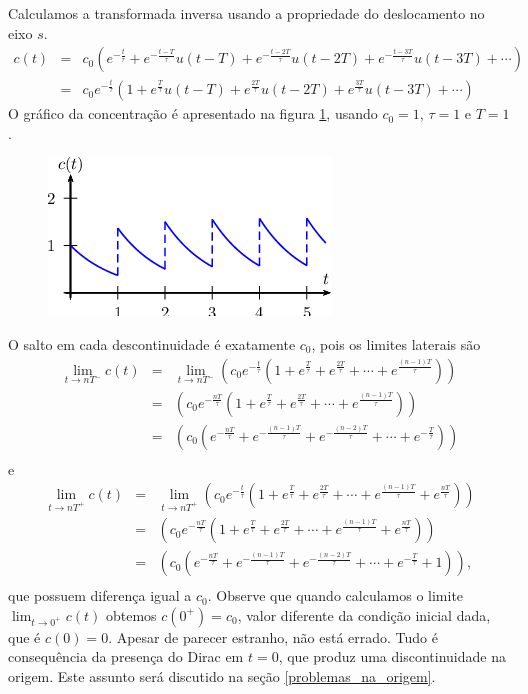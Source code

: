 \documentclass[a4paper,10pt]{book}
\begin{document}
Calculamos a transformada inversa usando a propriedade do deslocamento no eixo $s$.
 \begin{eqnarray*}
 c(t)&=&c_0\left(e^{-\frac{t}{\tau}}+e^{-\frac{t-T}{\tau}}u(t-T)+e^{-\frac{t-2T}{\tau}}u(t-2T)+e^{-\frac{t-3T}{\tau}}u(t-3T)+\cdots\right) \\
 &=&c_0e^{-\frac{t}{\tau}}\left(1+e^{\frac{T}{\tau}}u(t-T)+e^{\frac{2T}{\tau}}u(t-2T)+e^{\frac{3T}{\tau}}u(t-3T)+\cdots\right)
 \end{eqnarray*}
  O gráfico da concentração é apresentado na figura \ref{concentracao}, usando $c_0=1$, $\tau=1$ e $T=1$.
\begin{figure}[!ht]
\begin{center}
\includegraphics{figs/figura_dirac_12}\end{center}
 \caption{\label{concentracao}}
 \end{figure}
 O salto em cada descontinuidade é exatamente $c_0$, pois os limites laterais são
 \begin{eqnarray*}
 \lim_{t\to nT^-}c(t)&=&\lim_{t\to nT^-}\left(c_0e^{-\frac{t}{\tau}}\left(1+e^{\frac{T}{\tau}}+e^{\frac{2T}{\tau}}+\cdots+ e^{\frac{(n-1)T}{\tau}}\right)\right)\\
 &=&\left(c_0e^{-\frac{nT}{\tau}}\left(1+e^{\frac{T}{\tau}}+e^{\frac{2T}{\tau}}+\cdots+ e^{\frac{(n-1)T}{\tau}}\right)\right)\\
&=&\left(c_0\left(e^{-\frac{nT}{\tau}}+e^{-\frac{(n-1)T}{\tau}}+e^{-\frac{(n-2)T}{\tau}}+\cdots+ e^{-\frac{T}{\tau}}\right)\right)\\
\end{eqnarray*}
e
\begin{eqnarray*}
\lim_{t\to nT^+}c(t)&=&\lim_{t\to nT^+}\left(c_0e^{-\frac{t}{\tau}}\left(1+e^{\frac{T}{\tau}}+e^{\frac{2T}{\tau}}+\cdots+ e^{\frac{(n-1)T}{\tau}}+ e^{\frac{nT}{\tau}}\right)\right)\\
&=&\left(c_0e^{-\frac{nT}{\tau}}\left(1+e^{\frac{T}{\tau}}+e^{\frac{2T}{\tau}}+\cdots+ e^{\frac{(n-1)T}{\tau}}+ e^{\frac{nT}{\tau}}\right)\right)\\
&=&\left(c_0\left(e^{-\frac{nT}{\tau}}+e^{-\frac{(n-1)T}{\tau}}+e^{-\frac{(n-2)T}{\tau}}+\cdots+ e^{-\frac{T}{\tau}}+1\right)\right),\\
\end{eqnarray*}
 que possuem diferença igual a $c_0$. 
 Observe que quando calculamos o limite $\displaystyle \lim_{t\to 0^+}c(t)$ obtemos $c(0^+)=c_0$, valor diferente da condição inicial dada, que é $c(0)=0$. Apesar de parecer estranho, não está errado. Tudo é consequência da presença do Dirac em $t=0$, que produz uma discontinuidade na origem. Este assunto será discutido na seção \ref{problemas_na_origem}.
\end{document}
